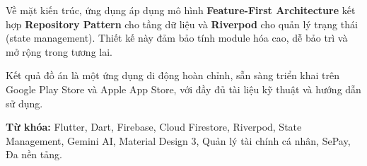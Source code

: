 Về mặt kiến trúc, ứng dụng áp dụng mô hình \textbf{Feature-First Architecture} kết hợp \textbf{Repository Pattern} cho tầng dữ liệu và \textbf{Riverpod} cho quản lý trạng thái (state management). Thiết kế này đảm bảo tính module hóa cao, dễ bảo trì và mở rộng trong tương lai.

Kết quả đồ án là một ứng dụng di động hoàn chỉnh, sẵn sàng triển khai trên Google Play Store và Apple App Store, với đầy đủ tài liệu kỹ thuật và hướng dẫn sử dụng.

\vspace{0.5cm}
\noindent\textbf{Từ khóa:} Flutter, Dart, Firebase, Cloud Firestore, Riverpod, State Management, Gemini AI, Material Design 3, Quản lý tài chính cá nhân, SePay, Đa nền tảng.
